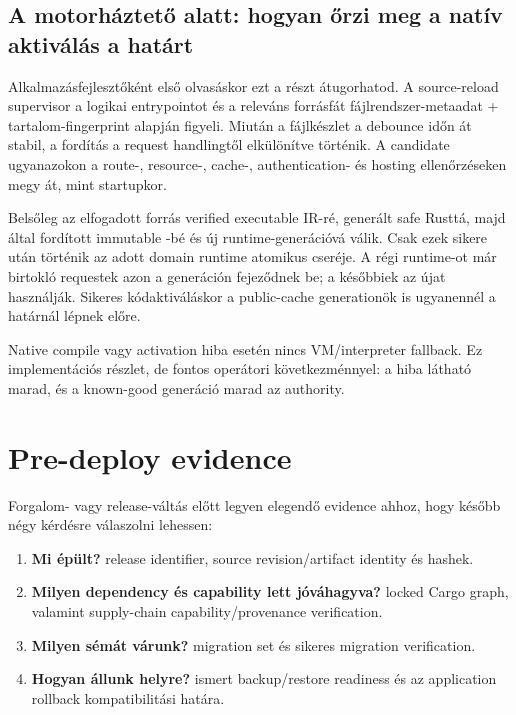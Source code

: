 \subsection*{A motorháztető alatt: hogyan őrzi meg a natív aktiválás a határt}

Alkalmazásfejlesztőként első olvasáskor ezt a részt átugorhatod. A source-reload supervisor a logikai entrypointot és a releváns forrásfát fájlrendszer-metaadat + tartalom-fingerprint alapján figyeli. Miután a fájlkészlet a debounce időn át stabil, a fordítás a request handlingtől elkülönítve történik. A candidate ugyanazokon a route-, resource-, cache-, authentication- és hosting ellenőrzéseken megy át, mint startupkor.

Belsőleg az elfogadott forrás verified executable IR-ré, generált safe Rusttá, majd  által fordított immutable -bé és új runtime-generációvá válik. Csak ezek sikere után történik az adott domain runtime atomikus cseréje. A régi runtime-ot már birtokló requestek azon a generáción fejeződnek be; a későbbiek az újat használják. Sikeres kódaktiváláskor a public-cache generationök is ugyanennél a határnál lépnek előre.

Native compile vagy activation hiba esetén nincs VM/interpreter fallback. Ez implementációs részlet, de fontos operátori következménnyel: a hiba látható marad, és a known-good generáció marad az authority.

\section{Pre-deploy evidence}

Forgalom- vagy release-váltás előtt legyen elegendő evidence ahhoz, hogy később négy kérdésre válaszolni lehessen:

\begin{enumerate}
  \item \textbf{Mi épült?} release identifier, source revision/artifact identity és hashek.
  \item \textbf{Milyen dependency és capability lett jóváhagyva?} locked Cargo graph, valamint supply-chain capability/provenance verification.
  \item \textbf{Milyen sémát várunk?} migration set és sikeres migration verification.
  \item \textbf{Hogyan állunk helyre?} ismert backup/restore readiness és az application rollback kompatibilitási határa.
\end{enumerate}

